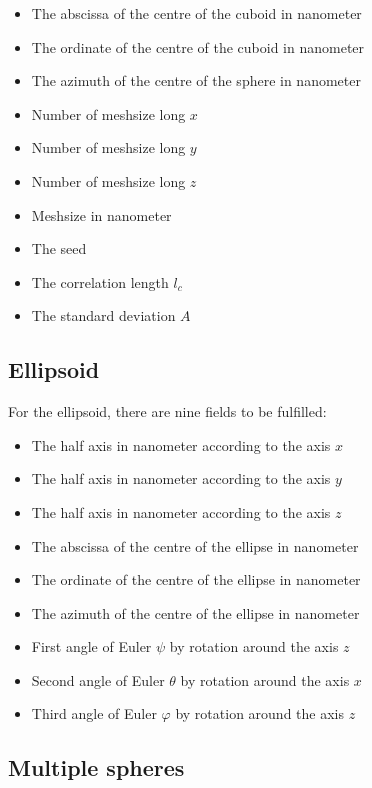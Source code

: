 \begin{itemize}
\item The abscissa of the centre of the cuboid in nanometer
\item The ordinate of the centre of the cuboid in nanometer
\item The azimuth of the centre of the sphere in nanometer
\item Number of meshsize long $x$
\item Number of meshsize long $y$
\item Number of meshsize long $z$
\item Meshsize in nanometer
\item The seed
\item The correlation length $l_c$
\item The standard deviation $A$

\end{itemize}


\subsection{Ellipsoid}

For the ellipsoid, there are nine fields to be fulfilled:

\begin{itemize}
\item The half axis in nanometer according to the axis $x$
\item The half axis in nanometer according to the axis $y$
\item The half axis in nanometer according to the axis $z$
\item The abscissa of the centre of the ellipse in nanometer
\item The ordinate of the centre of the ellipse in nanometer
\item The azimuth of the centre of the ellipse in nanometer
\item First angle of Euler $\psi$ by rotation around the axis $z$
\item Second angle of Euler $\theta$ by rotation around the axis $x$
\item Third angle of Euler $\varphi$ by rotation around the axis $z$
\end{itemize}


\subsection{Multiple spheres}

